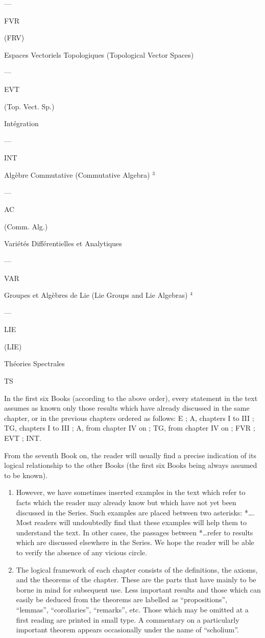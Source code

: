 ---

FVR

(FRV)

Espaces Vectoriels Topologiques (Topological Vector Spaces)

---

EVT

(Top. Vect. Sp.)

Intégration

---

INT

Algèbre Commutative (Commutative Algebra) \(^{3}\)

---

AC

(Comm. Alg.)

Variétés Différentielles et Analytiques

---

VAR

Groupes et Algèbres de Lie (Lie Groups and Lie Algebras) \(^{4}\)

---

LIE

(LIE)

Théories Spectrales

TS

In the first six Books (according to the above order), every statement in the text assumes as known only those results which have already discussed in the same chapter, or in the previous chapters ordered as follows: E ; A, chapters I to III ; TG, chapters I to III ; A, from chapter IV on ; TG, from chapter IV on ; FVR ; EVT ; INT.

From the seventh Book on, the reader will usually find a precise indication of its logical relationship to the other Books (the first six Books being always assumed to be known).

\begin{enumerate}
\def\labelenumi{\arabic{enumi}.}
\setcounter{enumi}{3}
\item
  However, we have sometimes inserted examples in the text which refer to facts which the reader may already know but which have not yet been discussed in the Series. Such examples are placed between two asterisks: *\ldots*. Most readers will undoubtedly find that these examples will help them to understand the text. In other cases, the passages between *\ldots* refer to results which are discussed elsewhere in the Series. We hope the reader will be able to verify the absence of any vicious circle.
\item
  The logical framework of each chapter consists of the definitions, the axioms, and the theorems of the chapter. These are the parts that have mainly to be borne in mind for subsequent use. Less important results and those which can easily be deduced from the theorems are labelled as ``propositions'', ``lemmas'', ``corollaries'', ``remarks'', etc. Those which may be omitted at a first reading are printed in small type. A commentary on a particularly important theorem appears occasionally under the name of ``scholium''.
\end{enumerate}

